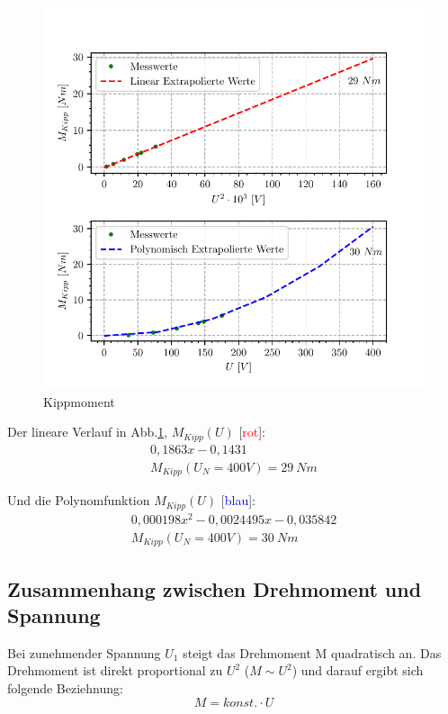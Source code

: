 \documentclass[conference]{IEEEtran}
\begin{document}
\vspace{-7ex}
\begin{figure}[htbp]
    \centering
    \includegraphics[width=\columnwidth]{./kippmoment.pdf}
    \caption{Kippmoment}
    \label{fig:Kippmoment}
\end{figure}

Der lineare Verlauf in Abb.\ref{fig:Kippmoment}, $M_{\textit{Kipp}}(U)$ [\textcolor{red}{rot}]:
\begin{gather*}
    0,1863 x - 0,1431\\
    M_{Kipp}(U_N=400V)=29 \ Nm
\end{gather*}

Und die Polynomfunktion $M_{\textit{Kipp}}(U)$ [\textcolor{blue}{blau}]:
\begin{gather*}
    0,000198 x^2 - 0,0024495 x -0,035842\\
    M_{Kipp}(U_N=400V)=30\ Nm
\end{gather*}



\subsection{Zusammenhang zwischen Drehmoment und Spannung}

Bei zunehmender Spannung $U_1$ steigt das Drehmoment M quadratisch an. Das
Drehmoment ist direkt proportional zu $U^2$ ($M \sim U^2$) und darauf ergibt sich
folgende Beziehnung: \[ M = \textit{konst.} \cdot U \]
\end{document}
